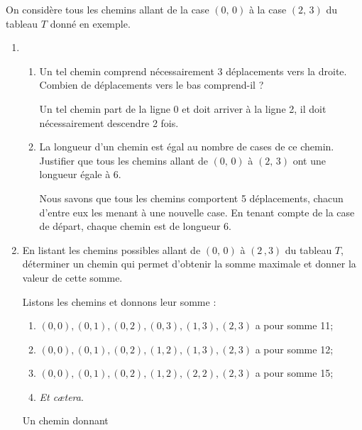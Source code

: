 \documentclass[a4paper,12pt,french]{article}
\begin{document}
On considère tous les chemins allant de la case $(0,\,0)$ à la case $(2,\,3)$ du tableau $T$ donné en exemple.
\begin{enumerate}[\bfseries 1.]
	\item 	\begin{enumerate}[\bfseries a.]
            	\item 	Un tel chemin comprend nécessairement 3 déplacements vers la droite. Combien de déplacements vers le bas comprend-il ?
                \begin{encadre}[Réponse]
                Un tel chemin part de la ligne 0 et doit arriver à la ligne 2, il doit nécessairement descendre 2 fois.
                \end{encadre}

            	\item 	 La longueur d'un chemin est égal au nombre de cases de ce chemin. Justifier que tous les chemins allant de $(0,\,0)$ à $(2,\,3)$ ont
                        une longueur égale à 6.
                 \begin{encadre}[Réponse]
                 Nous savons que tous les chemins comportent 5 déplacements, chacun d'entre eux les menant à une nouvelle case. En tenant compte de la case de départ, chaque chemin est de longueur 6.
                 \end{encadre}
             \end{enumerate}

    \item En listant les chemins possibles allant de $(0,\,0)$ à $(2\,,3)$ du tableau $T$, déterminer un chemin qui permet d'obtenir la somme maximale et donner la valeur de cette somme.
    \begin{encadre}[Réponse]
    Listons les chemins et donnons leur somme :
    \begin{enumerate}[--]
    	\item 	$(0,0),(0,1),(0,2),(0,3),(1,3),(2,3)$ a pour somme 11;

    	\item 	$(0,0),(0,1),(0,2),(1,2),(1,3),(2,3)$ a pour somme 12;
        \item 	$(0,0),(0,1),(0,2),(1,2),(2,2),(2,3)$ a pour somme 15;
        \item   \textit{Et cætera}.
     \end{enumerate}
     Un chemin donnant

    \end{encadre}


\end{enumerate}
\end{document}
